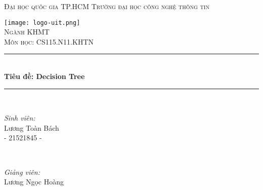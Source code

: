 \documentclass[12pt, a4paper]{article}
\begin{document}
\begin{titlepage}

\newcommand{\HRule}{\rule{\linewidth}{0.5mm}} 

\center %
 

\textsc{\LARGE Đại học quốc gia TP.HCM}
\newline
\textsc{\LARGE Trường đại học công nghệ thông tin}\\[1.5cm] 


\graphicspath{ {./logo/} }
 
\texttt{[image: logo-uit.png]}\\[1.5cm]

\textsc{\Large Ngành KHMT}\\[0.5cm] 

\textsc{\large Môn học: CS115.N11.KHTN }\\[1.0cm] 


\HRule \\[0.4cm]
{ \huge \bfseries Tiêu đề: Decision Tree}\\[0.4cm] 
\HRule \\[1.5cm]
 

\begin{minipage}{0.4\textwidth}
\begin{flushleft} \large
\emph{Sinh viên:}\\
Lương Toàn Bách \\
- 21521845 -
\end{flushleft}
\end{minipage}
~
\begin{minipage}{0.4\textwidth}
\begin{flushright} \large
\emph{Giảng viên:} \\
Lương Ngọc Hoàng
\end{flushright}
\end{minipage}\\[2cm]





\vfill 

\end{titlepage}
\tableofcontents
\newpage
\end{document}
